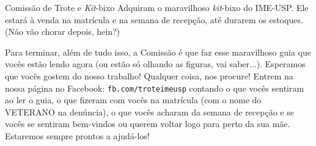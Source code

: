 \begin{secao}{Comissão de Trote e \textit{Kit}-bixo}
Adquiram o maravilhoso \textit{kit}-bixo do IME-USP. Ele estará à venda na
matrícula e na semana de recepção, até durarem os estoques. (Não vão chorar
depois, hein?)

Para terminar, além de tudo isso, a Comissão é que faz esse maravilhoso guia que
vocês estão lendo agora (ou estão só olhando as figuras, vai
saber...). Esperamos que vocês gostem do nosso trabalho! Qualquer coisa, nos
procure! Entrem na nossa página no Facebook: {\tt fb.com/troteimeusp} contando o
que vocês sentiram ao ler o guia, o que fizeram com vocês na matrícula (com o
nome do VETERANO na denúncia), o que vocês acharam da semana de recepção e se
vocês se sentiram bem-vindos ou querem voltar logo para perto da sua
mãe. Estaremos sempre prontos a ajudá-los!
\end{secao}
